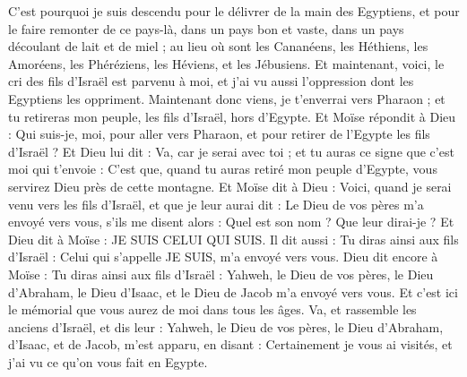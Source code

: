 \begin{multicols}{2}
C'est pourquoi je suis descendu pour le délivrer de la main des Egyptiens, et pour le faire remonter de ce pays-là, dans un pays bon et vaste, dans un pays découlant de lait et de miel ; au lieu où sont les Cananéens, les Héthiens, les Amoréens, les Phéréziens, les Héviens, et les Jébusiens.
Et maintenant, voici, le cri des fils d'Israël est parvenu à moi, et j'ai vu aussi l'oppression dont les Egyptiens les oppriment.
Maintenant donc viens, je t'enverrai vers Pharaon ; et tu retireras mon peuple, les fils d'Israël, hors d'Egypte.
Et Moïse répondit à Dieu : Qui suis-je, moi, pour aller vers Pharaon, et pour retirer de l'Egypte les fils d'Israël ?
 Et Dieu lui dit : Va, car je serai avec toi ; et tu auras ce signe que c’est moi qui t’envoie : C'est que, quand tu auras retiré mon peuple d'Egypte, vous servirez Dieu près de cette montagne.
Et Moïse dit à Dieu : Voici, quand je serai venu vers les fils d'Israël, et que je leur aurai dit : Le Dieu de vos pères m'a envoyé vers vous, s'ils me disent alors : Quel est son nom ? Que leur dirai-je ?
 Et Dieu dit à Moïse : JE SUIS CELUI QUI SUIS. Il dit aussi : Tu diras ainsi aux fils d'Israël : Celui qui s'appelle JE SUIS, m'a envoyé vers vous.
Dieu dit encore à Moïse : Tu diras ainsi aux fils d'Israël : Yahweh, le Dieu de vos pères, le Dieu d'Abraham, le Dieu d'Isaac, et le Dieu de Jacob m'a envoyé vers vous. Et c'est ici le mémorial que vous aurez de moi dans tous les âges.
Va, et rassemble les anciens d'Israël, et dis leur : Yahweh, le Dieu de vos pères, le Dieu d'Abraham, d'Isaac, et de Jacob, m'est apparu, en disant : Certainement je vous ai visités, et j'ai vu ce qu'on vous fait en Egypte.

\end{multicols}
